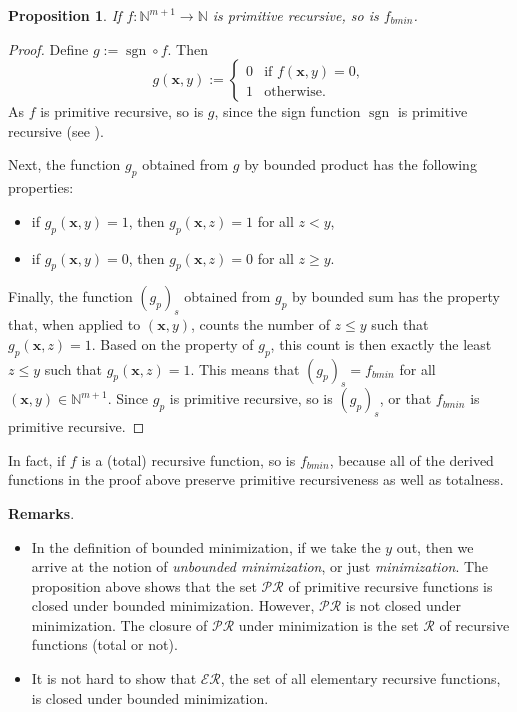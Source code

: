 \documentclass[12pt]{article}
\newtheorem{prop}{Proposition}
\begin{document}
\begin{prop}  If $f:\mathbb{N}^{m+1}\to \mathbb{N}$ is primitive recursive, so is $f_{bmin}$. \end{prop}
\begin{proof}
Define $g:=\operatorname{sgn}\circ f$.  Then 
\begin{displaymath}
g(\boldsymbol{x},y):= \left\{
\begin{array}{ll}
0 & \textrm{if } f(\boldsymbol{x},y)=0, \\
1 & \textrm{otherwise.}
\end{array}
\right.
\end{displaymath}
As $f$ is primitive recursive, so is $g$, since the sign function $\operatorname{sgn}$ is primitive recursive (see ).

Next, the function $g_p$ obtained from $g$ by bounded product has the following properties:
\begin{itemize}
\item if $g_p(\boldsymbol{x},y)=1$, then $g_p(\boldsymbol{x},z)=1$ for all $z<y$,
\item if $g_p(\boldsymbol{x},y)=0$, then $g_p(\boldsymbol{x},z)=0$ for all $z\ge y$.
\end{itemize}

Finally, the function $(g_p)_s$ obtained from $g_p$ by bounded sum has the property that, when applied to $(\boldsymbol{x},y)$, counts the number of $z\le y$ such that $g_p(\boldsymbol{x},z)=1$.  Based on the property of $g_p$, this count is then exactly the least $z\le y$ such that $g_p(\boldsymbol{x},z)=1$.  This means that $(g_p)_s=f_{bmin}$ for all $(\boldsymbol{x},y)\in \mathbb{N}^{m+1}$.  Since $g_p$ is primitive recursive, so is $(g_p)_s$, or that $f_{bmin}$ is primitive recursive.
\end{proof}

In fact, if $f$ is a (total) recursive function, so is $f_{bmin}$, because all of the derived functions in the proof above preserve primitive recursiveness as well as totalness.

\textbf{Remarks}.  
\begin{itemize}
\item
In the definition of bounded minimization, if we take the $y$ out, then we arrive at the notion of \emph{unbounded minimization}, or just \emph{minimization}.  The proposition above shows that the set $\mathcal{PR}$ of primitive recursive functions is closed under bounded minimization.  However, $\mathcal{PR}$ is not closed under minimization.  The closure of $\mathcal{PR}$ under minimization is the set $\mathcal{R}$ of recursive functions (total or not).
\item
It is not hard to show that $\mathcal{ER}$, the set of all elementary recursive functions, is closed under bounded minimization.
\end{itemize}
\end{document}
